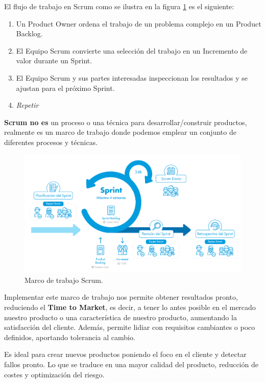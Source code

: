 \documentclass[12pt,twoside,titlepage]{report}
\begin{document}
El flujo de trabajo en Scrum como se ilustra en la figura \ref{fig:Scrum} es el siguiente:

\begin{enumerate}
    \item Un Product Owner ordena el trabajo de un problema complejo en un Product Backlog.
    \item El Equipo Scrum convierte una selección del trabajo en un Incremento de valor durante un Sprint.
    \item El Equipo Scrum y sus partes interesadas inspeccionan los resultados y se ajustan para el próximo Sprint.
    \item \textit{Repetir}
\end{enumerate}

\textbf{Scrum no es} un proceso o una técnica para desarrollar/construir productos, realmente es un marco de trabajo donde podemos emplear un conjunto de diferentes procesos y técnicas.

\begin{figure}[H]
    \centering
    \includegraphics[scale=0.39]{Scrum/Scrum}
    \caption{Marco de trabajo Scrum.}
    \label{fig:Scrum}
\end{figure}

Implementar este marco de trabajo nos permite obtener resultados pronto, reduciendo el \textbf{Time to Market}, es decir, a tener lo antes posible en el mercado nuestro producto o una característica de nuestro producto, aumentando la satisfacción del cliente. Además, permite lidiar con requisitos cambiantes o poco definidos, aportando tolerancia al cambio.

Es ideal para crear nuevos productos poniendo el foco en el cliente y detectar fallos pronto. Lo que se traduce en una mayor calidad del producto, reducción de costes y optimización del riesgo.
\cite{scrum2}
\end{document}
